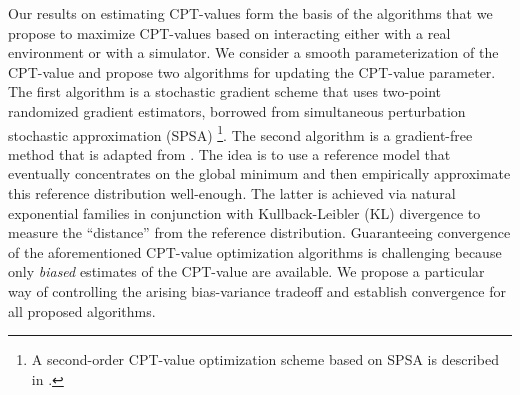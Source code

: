 Our results on estimating CPT-values form the basis of the algorithms that we propose to maximize CPT-values based on interacting either with a real environment or with a simulator. 
We consider a smooth parameterization of the CPT-value and propose two algorithms for updating the CPT-value parameter. The first algorithm is a stochastic gradient scheme that uses two-point randomized gradient estimators, borrowed from simultaneous perturbation stochastic approximation (SPSA) \cite{spall}\footnote{A second-order CPT-value optimization scheme based on SPSA is described in \cite{la2016cumulative}.}. 
The second algorithm is a gradient-free method that is adapted from \cite{chang2013simulation}. The idea is to use a reference model that eventually concentrates on the global minimum and then empirically approximate this reference distribution well-enough. The latter is achieved via natural exponential families in conjunction with Kullback-Leibler (KL) divergence to measure the ``distance'' from the reference distribution. 
Guaranteeing convergence of the aforementioned CPT-value optimization algorithms is challenging because only  \emph{biased} estimates of the CPT-value are available. We propose a particular way of controlling the arising bias-variance tradeoff and establish convergence for all proposed algorithms.

